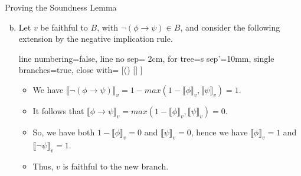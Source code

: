 \begin{frame}{Proving the Soundness Lemma}
	
	\begin{enumerate}[(a)]

	\setcounter{enumi}{1}
					
		\item Let $v$ be faithful to $B$, with $\neg(\phi\to\psi)\in B$, and consider the following extension by the negative implication rule.
				\begin{center}{\small
					\begin{prooftree}
					{
					line numbering=false,
					line no sep= 2cm,
					for tree={s sep'=10mm},
					single branches=true,
					close with=\xmark
					}
					[\neg(\phi\to\psi) [\phi [\neg\psi ] ] ]
					\end{prooftree}}
					\end{center}
					\medskip
								
		\begin{itemize}
		\itemsep=16pt

									
			\item We have $\llbracket\neg(\phi\to\psi)\rrbracket_v=1-max(1-\llbracket\phi\rrbracket_v, \llbracket\psi\rrbracket_v)=1$. 

			\item It follows that $\llbracket\phi\to\psi\rrbracket_v=max(1-\llbracket\phi\rrbracket_v, \llbracket\psi\rrbracket_v)=0$. 
			
			\item So, we have both $1-\llbracket\phi\rrbracket_v=0$ and $\llbracket\psi\rrbracket_v=0$, hence we have $\llbracket\phi\rrbracket_v=1$ and $\llbracket\neg\psi\rrbracket_v=1$.
			
		\item Thus, $v$ is faithful to the new branch.
	
		\end{itemize}
					
	\end{enumerate}

\end{frame}

